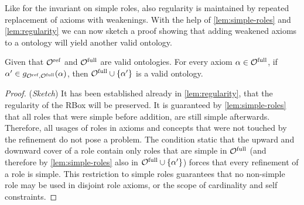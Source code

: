 Like for the invariant on simple roles, also regularity is maintained by repeated replacement of axioms with weakenings. With the help of \cref{lem:simple-roles} and \cref{lem:regularity} we can now sketch a proof showing that adding weakened axioms to a \SROIQ ontology will yield another valid \SROIQ ontology.

\begin{theorem} \label{lem:global-constraints}
  Given that ${\mathcal{O}^\textnormal{ref}}$ and ${\mathcal{O}^\textnormal{full}}$ are valid \SROIQ ontologies. For every axiom $\alpha \in {\mathcal{O}^\textnormal{full}}$, if $\alpha' \in g_{{\mathcal{O}^\textnormal{ref}},{\mathcal{O}^\textnormal{full}}}(\alpha)$, then ${\mathcal{O}^\textnormal{full}} \cup \{ \alpha' \}$ is a valid \SROIQ ontology.
\end{theorem}

\begin{proof}(\emph{Sketch})
  It has been established already in \cref{lem:regularity}, that the regularity of the RBox will be preserved.
  It is guaranteed by \cref{lem:simple-roles} that all roles that were simple before addition, are still simple afterwards. Therefore, all usages of roles in axioms and concepts that were not touched by the refinement do not pose a problem. The condition static that the upward and downward cover of a role contain only roles that are simple in ${\mathcal{O}^\textnormal{full}}$ (and therefore by \cref{lem:simple-roles} also in ${\mathcal{O}^\textnormal{full}} \cup \{ \alpha' \}$) forces that every refinement of a role is simple. This restriction to simple roles guarantees that no non-simple role may be used in disjoint role axioms, or the scope of cardinality and self constraints.
\end{proof}
